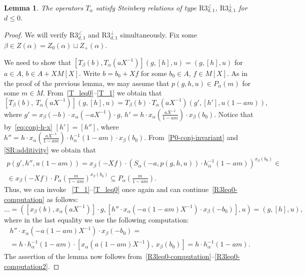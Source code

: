 \documentclass[oneside, 8pt]{amsart}
\newtheorem{lemma}{Lemma}
\theoremstyle{remark}
\theoremstyle{definition}
\numberwithin{lemma}{section}
\numberwithin{prop}{section}
\numberwithin{corollary}{section}
\numberwithin{externaltheorem}{section}
\numberwithin{equation}{section}
\begin{document}
\begin{lemma} \label{R3_leq0_1} The operators $T_\alpha$ satisfy Steinberg relations of type $\mathrm{R3}^\angle_{d, 1}$, $\mathrm{R3}^\bot_{d,1}$ for $d\leq 0$. \end{lemma}
\begin{proof}
We will verify $\mathrm{R3}^\angle_{d, 1}$ and $\mathrm{R3}^\bot_{d, 1}$ simultaneously. Fix some $\beta \in Z(\alpha) = Z_0(\alpha) \sqcup Z_+(\alpha)$.

We need to show that $[T_\beta(b), T_\alpha(aX^{-1})](g, [h], u) = (g, [h], u)$ for $a\in A$, $b\in A + XM[X]$. 
Write $b = b_0 + Xf$ for some $b_0 \in A$, $f \in M[X]$.
As in the proof of the previous lemma, we may assume that $p(g, h, u) \in P_\alpha(m)$ for some $m \in M$.
From~\eqref{T_leq0}--\eqref{T_1} we obtain that
\begin{equation} \label{R3leq0-computation}
  \left[T_\beta(b),\ T_\alpha(aX^{-1}) \right] (g, [h], u) = T_\beta(b) \cdot T_\alpha(aX^{-1}) \left(g', [h'], u(1-am)\right), \end{equation}
where $g' = x_\beta(-b) \cdot x_\alpha(-aX^{-1}) \cdot g$, $h' = h \cdot x_{\alpha}\left(\tfrac{aX^{-1}}{1-am}\right) \cdot x_\beta(b_0)$.
Notice that by~\eqref{eq:conj-h-x} $[h'] = [h'']$, where $h'' = h \cdot x_{\alpha}\left(\tfrac{aX^{-1}}{1-am}\right) \cdot h^{-1}_\alpha(1-am) \cdot x_\beta(b_0).$
From~\cref{P0-conj-invariant} and \cref{SR:additivity} we obtain that
\begin{multline*} p(g',h'',u(1-am)) = x_{\beta}(-Xf) \cdot \left(S_\alpha(-a, p(g,h,u)) \cdot h_{\alpha}^{-1}(1-am)\right)^{x_\beta(b_0)} \in \\ \in x_{\beta}(-Xf) \cdot P_\alpha(\tfrac{m}{1-am})^{x_\beta(b_0)} \subseteq P_\alpha(\tfrac{m}{1-am}).\end{multline*}
Thus, we can invoke ~\eqref{T_1}--\eqref{T_leq0} once again and can continue~\eqref{R3leq0-computation} as follows:
\begin{equation} \label{R3leq0-computation2} \ldots = \left( [x_\beta(b), x_{\alpha}(aX^{-1})] \cdot g, [h'' \cdot x_{\alpha}\left(-a(1-am)X^{-1}\right) \cdot x_{\beta}(-b_0)], u \right) = \left(g, [h], u\right), \end{equation}
where in the last equality we use the following computation:
\begin{multline} \nonumber
 h'' \cdot x_{\alpha}\left(-a(1-am)X^{-1}\right) \cdot x_{\beta}(-b_0) = \\ = h \cdot h_\alpha^{-1}(1-am) \cdot \left[x_\alpha\left(a(1-am)X^{-1}\right),\ x_\beta(b_0)\right] = h \cdot h_\alpha^{-1}(1-am). \end{multline}
The assertion of the lemma now follows from~\eqref{R3leq0-computation}--\eqref{R3leq0-computation2}. \end{proof}
\end{document}
